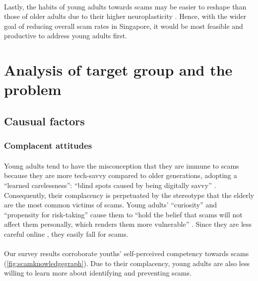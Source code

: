 \documentclass[a4paper]{article}
\begin{document}
\paragraph{} Lastly, the habits of young adults towards scams may be easier to
reshape than those of older adults due to their higher neuroplasticity
\parencite{GoodTherapy.2019}. Hence, with the wider goal of reducing overall
scam rates in Singapore, it would be most feasible and productive to address
young adults first.

\section{Analysis of target group and the problem}
\subsection{Causual factors}
\subsubsection{Complacent attitudes}
\paragraph{} Young adults tend to have the misconception that they are immune to
scams because they are more tech-savvy compared to older generations, adopting a
“learned carelessness”: “blind spots caused by being digitally savvy”
\parencite{Yuan.2023}. Consequently, their complacency is perpetuated by the
stereotype that the elderly are the most common victims of scams. Young adults’
“curiosity” and “propensity for risk-taking” cause them to “hold the belief that
scams will not affect them personally, which renders them more vulnerable”
\parencite{Cheung.2023}. Since they are less careful online
\parencite{Carlson.2022}, they easily fall for scams.

\paragraph{} Our survey results corroborate youths’ self-perceived competency
towards scams (\cref{fig:scamknowledgegraph}). Due to their complacency, young
adults are also less willing to learn more about identifying and preventing
scams.
\end{document}
